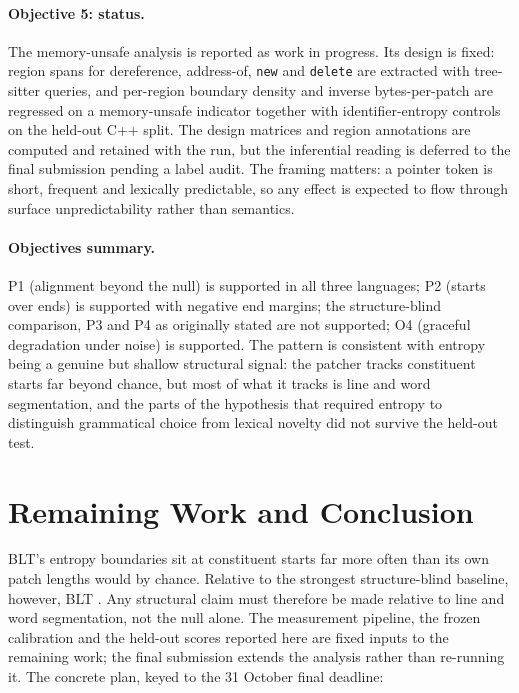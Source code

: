 \paragraph{Objective 5: status.} The memory-unsafe analysis is reported as work in progress. Its design is fixed: region spans for dereference, address-of, \texttt{new} and \texttt{delete} are extracted with tree-sitter queries, and per-region boundary density and inverse bytes-per-patch are regressed on a memory-unsafe indicator together with identifier-entropy controls on the held-out C++ split. The design matrices and region annotations are computed and retained with the run, but the inferential reading is deferred to the final submission pending a label audit. The framing matters: a pointer token is short, frequent and lexically predictable, so any effect is expected to flow through surface unpredictability rather than semantics.

\paragraph{Objectives summary.} P1 (alignment beyond the null) is supported in all three languages; P2 (starts over ends) is supported with negative end margins; the structure-blind comparison, P3 and P4 as originally stated are not supported; O4 (graceful degradation under noise) is supported. The pattern is consistent with entropy being a genuine but shallow structural signal: the patcher tracks constituent starts far beyond chance, but most of what it tracks is line and word segmentation, and the parts of the hypothesis that required entropy to distinguish grammatical choice from lexical novelty did not survive the held-out test.

\section{Remaining Work and Conclusion}
BLT's entropy boundaries sit at constituent starts far more often than its own patch lengths would by chance. Relative to the strongest structure-blind baseline, however, BLT \RTwoAll{}. Any structural claim must therefore be made relative to line and word segmentation, not the null alone.
The measurement pipeline, the frozen calibration and the held-out scores reported here are fixed inputs to the remaining work; the final submission extends the analysis rather than re-running it. The concrete plan, keyed to the 31 October final deadline:

